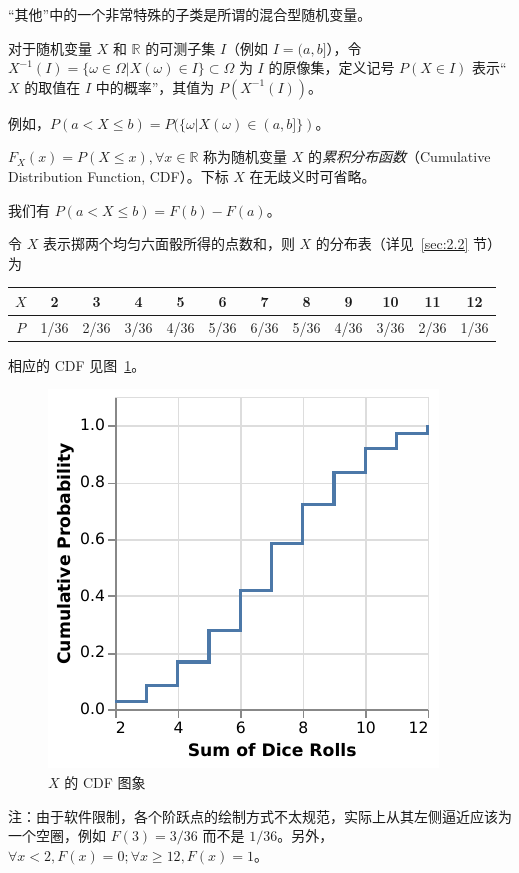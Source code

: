 \documentclass[../main.tex]{subfiles}
\begin{document}
“其他”中的一个非常特殊的子类是所谓的混合型随机变量。

\begin{definition}\label{def:2.1.2}
  对于随机变量 $X$ 和 $\mathbb{R}$ 的可测子集 $I$（例如 $I=(a,b]$），令 $X^{-1}(I)=\{\omega\in\Omega|X(\omega)\in I\}\subset\Omega$ 为 $I$ 的原像集，定义记号 $P(X\in I)$ 表示“$X$ 的取值在 $I$ 中的概率”，其值为 $P(X^{-1}(I))$。
\end{definition}

例如，$P(a<X\leq b)=P(\{\omega|X(\omega)\in(a,b]\})$。

\begin{definition}\label{def:2.1.3}
  $F_X(x)=P(X\leq x),\forall x\in\mathbb{R}$ 称为随机变量 $X$ 的\emph{累积分布函数}（Cumulative Distribution Function, CDF）。下标 $X$ 在无歧义时可省略。
\end{definition}

我们有 $P(a<X\leq b)=F(b)-F(a)$。

\begin{example}
  令 $X$ 表示掷两个均匀六面骰所得的点数和，则 $X$ 的分布表（详见~\ref{sec:2.2} 节）为

  \bigskip
  \begin{tabular}{|c|c|c|c|c|c|c|c|c|c|c|c|}
    \hline
    $X$ & 2    & 3    & 4    & 5    & 6    & 7    & 8    & 9    & 10   & 11   & 12   \\
    \hline
    $P$ & 1/36 & 2/36 & 3/36 & 4/36 & 5/36 & 6/36 & 5/36 & 4/36 & 3/36 & 2/36 & 1/36 \\
    \hline
  \end{tabular}
  \bigskip

  相应的 CDF 见图~\ref{fig:2.1.1}。

  \begin{figure}[!h]
    \centering
    \includegraphics{figures/sum_2_dice_cdf.pdf}
    \caption{$X$ 的 CDF 图象}
    \label{fig:2.1.1}
  \end{figure}

  注：由于软件限制，各个阶跃点的绘制方式不太规范，实际上从其左侧逼近应该为一个空圈，例如 $F(3)=3/36$ 而不是 $1/36$。另外，$\forall x<2,F(x)=0;\forall x\geq 12,F(x)=1$。
\end{example}
\end{document}

